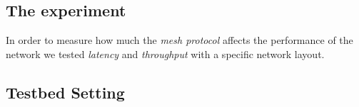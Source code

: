\begin{multicols}{2}

    \subsection{The experiment}

        In order to measure how much the \emph{mesh protocol} affects the
        performance of the network we tested \emph{latency} and
        \emph{throughput} with a specific network layout.

    \subsection{Testbed Setting}

\end{multicols}


